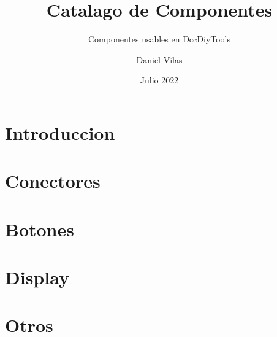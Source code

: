\documentclass[spanish]{DccDiyTools/DccDiyTools}
\title{Catalago de Componentes}
\subtitle{Componentes usables en DccDiyTools}
\author{Daniel Vilas}
\date{Julio 2022}
\begin{document}
\maketitle

\section{Introduccion}


\newpage
\section{Conectores}


\newpage
\section{Botones}


\newpage
\section{Display}



\newpage
\section{Otros}

\end{document}
